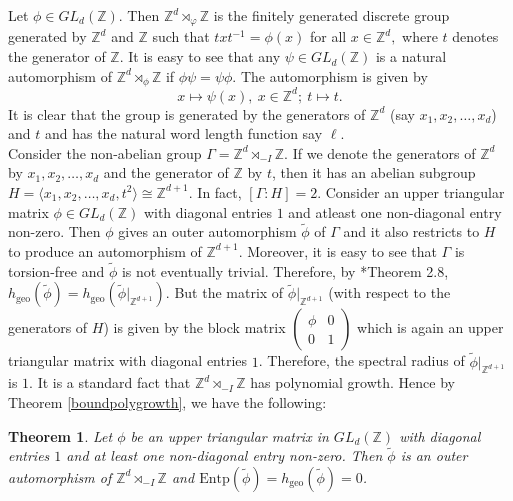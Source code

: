 \documentclass[a4paper,11pt,reqno]{amsart}
\theoremstyle{plain}
\newtheorem{thm}{Theorem}[section]
\theoremstyle{mainthmstyle}
\theoremstyle{named}
\numberwithin{equation}{section}
\begin{document}
 \indent  Let $\phi\in GL_{d}(\mathbb{Z})$. Then $\mathbb Z^{d} \rtimes_{\varphi} \mathbb Z$ is the finitely generated discrete group generated by $\mathbb{Z}^{d}$ and $\mathbb{Z}$ such that $txt^{-1}=\phi(x)$ for all $x\in\mathbb{Z}^{d},$ where $t$ denotes the generator of $\mathbb{Z}$. It is easy to see that any $\psi\in GL_{d}(\mathbb{Z})$ is a natural automorphism of $\mathbb{Z}^{d}\rtimes_{\phi}\mathbb{Z}$ if $\phi\psi=\psi\phi$. The automorphism is given by
\begin{displaymath}
    x\mapsto\psi(x), \ x\in\mathbb{Z}^d; \ t\mapsto t.
\end{displaymath}
It is clear that the group is generated by the generators of $\mathbb{Z}^d$ (say $x_{1},x_{2},\ldots,x_{d}$) and $t$ and has the natural word length function say $\ell$. \\Consider the non-abelian group $\Gamma=\mathbb{Z}^d\rtimes_{-I}\mathbb{Z}$. If we denote the generators of $\mathbb{Z}^d$ by $x_{1},x_{2},\ldots,x_{d}$ and the generator of $\mathbb{Z}$ by $t$, then it has an abelian subgroup $H=\langle x_{1},x_2,\ldots,x_{d},t^2\rangle\cong\mathbb{Z}^{d+1}$. In fact, $[\Gamma:H]=2$. Consider an upper triangular matrix $\phi\in GL_{d}(\mathbb{Z})$ with diagonal entries $1$ and atleast one non-diagonal entry non-zero. Then $\phi$ gives an outer automorphism $\widetilde {\phi}$ of $\Gamma$ and it also restricts to $H$ to produce an automorphism of $\mathbb{Z}^{d+1}$. Moreover, it is easy to see that $\Gamma$ is torsion-free and $\widetilde{\phi}$ is not eventually trivial. Therefore, by \cite{MR4168745}*{Theorem 2.8}, $h_{\mathrm{geo}}(\widetilde {\phi})=h_{\mathrm{geo}}(\widetilde {\phi} \vert_{\mathbb{Z}^{d+1}})$. But the matrix of $\widetilde {\phi} \vert_{\mathbb{Z}^{d+1}}$ (with respect to the generators of $H$) is given by the block matrix $\begin{pmatrix} \phi & 0 \\ 0 & 1 \end{pmatrix}$ which is again an upper triangular matrix with diagonal entries $1$. Therefore, the spectral radius of $\widetilde{\phi} \rvert_{\mathbb Z^{d + 1}}$ is $1$. It is a standard fact that $\mathbb{Z}^d\rtimes_{-I}\mathbb{Z}$ has polynomial growth. Hence by Theorem \ref{boundpolygrowth}, we have the following$:$
 \begin{thm}
  Let $\phi$ be an upper triangular matrix in $GL_{d}(\mathbb{Z})$ with diagonal entries $1$ and at least one non-diagonal entry non-zero. Then $\widetilde {\phi}$ is an outer automorphism of $\mathbb{Z}^d\rtimes_{-I}\mathbb{Z}$ and $\mathrm{Entp}(\widetilde{\phi})=h_{\mathrm{geo}}(\widetilde {\phi})=0$.    
 \end{thm}
\end{document}
